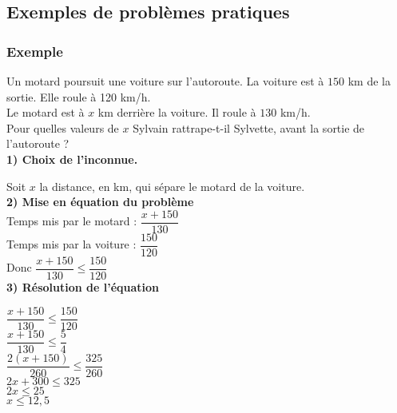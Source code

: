 \newpage

\subsection{Exemples de problèmes pratiques}

\subsubsection{Exemple }

Un motard poursuit une voiture sur l'autoroute. La voiture est à $150$ km de la sortie. Elle roule à 120 km/h. \\ 

Le motard est à $x$ km derrière la voiture. Il roule à $130$ km/h. \\ 

Pour quelles valeurs de $x$ Sylvain rattrape-t-il Sylvette, avant la sortie de l'autoroute ? \\

\textbf{1) Choix de l'inconnue.}

Soit $x$ la distance, en km, qui sépare le motard de la voiture. \\

\textbf{2) Mise en équation du problème} \\

Temps mis par le motard  : $\dfrac{x+150}{130} $ \\

Temps mis par la voiture : $\dfrac{150}{120} $ \\

Donc $ \dfrac{x+150}{130} \leqslant \dfrac{150}{120}$ \\

\textbf{3) Résolution de l'équation}

$ \dfrac{x+150}{130} \leqslant \dfrac{150}{120}$ \\

$ \dfrac{x+150}{130} \leqslant \dfrac{5}{4}$ \\

$ \dfrac{2\left(x+150\right)}{260} \leqslant \dfrac{325}{260} $ \\

$ 2x + 300 \leqslant 325 $ \\

$ 2x \leqslant 25 $ \\

$ x \leqslant 12,5 $ \\

